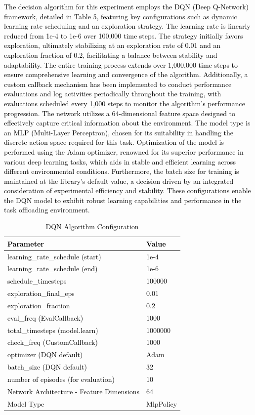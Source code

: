 \documentclass[preprint,12pt]{elsarticle}
\begin{document}
\textcolor{black}{The decision algorithm for this experiment employs the DQN (Deep Q-Network) framework, detailed in Table 5, featuring key configurations such as dynamic learning rate scheduling and an exploration strategy. The learning rate is linearly reduced from 1e-4 to 1e-6 over 100,000 time steps. The strategy initially favors exploration, ultimately stabilizing at an exploration rate of 0.01 and an exploration fraction of 0.2, facilitating a balance between stability and adaptability. The entire training process extends over 1,000,000 time steps to ensure comprehensive learning and convergence of the algorithm.
Additionally, a custom callback mechanism has been implemented to conduct performance evaluations and log activities periodically throughout the training, with evaluations scheduled every 1,000 steps to monitor the algorithm's performance progression. The network utilizes a 64-dimensional feature space designed to effectively capture critical information about the environment. The model type is an MLP (Multi-Layer Perceptron), chosen for its suitability in handling the discrete action space required for this task. Optimization of the model is performed using the Adam optimizer, renowned for its superior performance in various deep learning tasks, which aids in stable and efficient learning across different environmental conditions. Furthermore, the batch size for training is maintained at the library's default value, a decision driven by an integrated consideration of experimental efficiency and stability. These configurations enable the DQN model to exhibit robust learning capabilities and performance in the task offloading environment.}

\textcolor{black}{
\begin{table}[hbt]
    \begin{tabularx}{\textwidth} {m{}<{\raggedright}m{}<{\raggedright}}
    \hline
    \textbf{Parameter} & \textbf{Value} \\
    \hline
    learning\_rate\_schedule (start) & 1e-4\\
    learning\_rate\_schedule (end) & 1e-6\\
    schedule\_timesteps & 100000\\
    exploration\_final\_eps & 0.01\\
    exploration\_fraction & 0.2\\
    eval\_freq (EvalCallback) & 1000\\
    total\_timesteps (model.learn) & 1000000\\
    check\_freq (CustomCallback) & 1000\\
    optimizer (DQN default) & Adam\\
    batch\_size (DQN default) & 32\\
    number of episodes (for evaluation) & 10\\
    Network Architecture - Feature Dimensions & 64 \\
    Model Type & MlpPolicy\\
    \hline
    \end{tabularx}
    \caption{DQN Algorithm Configuration}
\end{table}}
\end{document}
